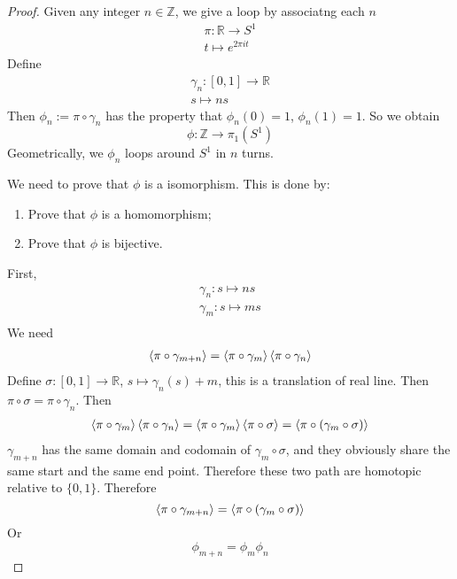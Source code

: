 \begin{proof}
    Given any integer $n\in \mathbb{Z}$, we give a loop by associatng
    each $n$ 
    \begin{align*}
        \pi : \mathbb{R} \to S^1 \\
        t \mapsto e^{2\pi it}
    \end{align*}
    Define 
    \begin{align}
        \gamma_n : [0,1] \to \mathbb{R} \\
        s\mapsto n s
    \end{align}
    Then $\phi_n:= \pi\circ \gamma_n$ has the property that
    $\phi_n(0)=1$, $\phi_n(1)=1$. So we obtain 
    \begin{equation}
        \phi: \mathbb{Z} \to \pi_1  (S^1)
    \end{equation}
    Geometrically, we $\phi_n$ loops around $S^1$ in $n$ turns.

    We need to prove that $\phi$ is a isomorphism. This is done by:
    \begin{enumerate}
        \item Prove that $\phi$ is a homomorphism;
        \item Prove that $\phi$ is bijective.
    \end{enumerate}
    First,
    \begin{align*}
        \gamma_n: s \mapsto n s \\
        \gamma_m: s\mapsto m s\\
    \end{align*}
    We need
    \begin{align*}
        \braket{\pi\circ \gamma_{m+n}} =
        \braket{\pi\circ\gamma_m}\braket{\pi\circ \gamma_n}\\
    \end{align*}
    Define $\sigma:[0,1]\to \mathbb{R}$, $s\mapsto \gamma_n(s)+m$,
    this is a translation of real line. Then $\pi\circ \sigma =
    \pi\circ \gamma_n$. Then
    \begin{align*}
        \braket{\pi\circ\gamma_m}\braket{\pi\circ \gamma_n}
        = \braket{\pi\circ\gamma_m} \braket{\pi\circ\sigma}
        = \braket{\pi\circ(\gamma_m\circ \sigma)}
    \end{align*}
    $\gamma_{m+n}$ has the same domain and codomain of $\gamma_m \circ
    \sigma$, and they obviously share the same start and the same end
    point. Therefore these two path are homotopic relative to
    $\{0,1\}$.
    Therefore
    \begin{equation}
        \braket{\pi\circ \gamma_{m+n}} =
        \braket{\pi\circ(\gamma_m\circ\sigma)}
    \end{equation}
    Or
    \begin{equation}
        \phi_{m+n} = \phi_{m}\phi_n
    \end{equation}


\end{proof}
